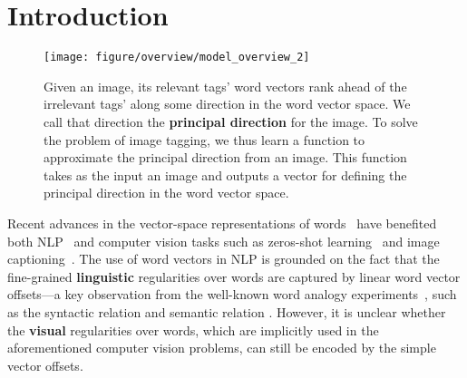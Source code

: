 \documentclass[10pt,twocolumn,letterpaper]{article}
\begin{document}
\section{Introduction}
\label{sIntro}

\begin{figure}[t]
\begin{center}
\texttt{[image: figure/overview/model\_overview\_2]}
\end{center}
   \caption{Given an image, its relevant tags\rq{} word vectors  rank ahead of  the irrelevant tags\rq{} along some direction in the word vector space. We call that direction the \textbf{principal direction} for the image. To solve the problem of image tagging, we thus learn a function  to approximate the principal direction from an image. This function takes as the input an image  and outputs a vector  for defining the principal direction in the word vector space. }
\label{fConcept}
\vspace{-10pt} 
\end{figure}

Recent advances in the vector-space representations of words~\cite{mikolov_efficient_2013,mikolov_distributed_2013,pennington_glove:_2014} have benefited
both NLP~\cite{socher_parsing_2013,zou_bilingual_2013,tellex_quantitative_2003} and  computer vision tasks such as zeros-shot learning~\cite{socher_zero-shot_2013,frome_devise:_2013,akata_label-embedding_2013} and image captioning~\cite{lebret_phrase-based_2015-1,karpathy_deep_2014,kiros_unifying_2014}. The use of word vectors in NLP is grounded on  the fact that the {fine-grained} \textbf{linguistic} regularities over words are captured by linear word vector offsets---a key observation from the well-known word analogy experiments~\cite{mikolov_linguistic_2013,pennington_glove:_2014}, such as the syntactic relation  and semantic relation . However, it is unclear whether the \textbf{visual} regularities over words, which are implicitly used in the aforementioned computer vision problems, can still be  encoded by the simple  vector offsets. 
\end{document}
